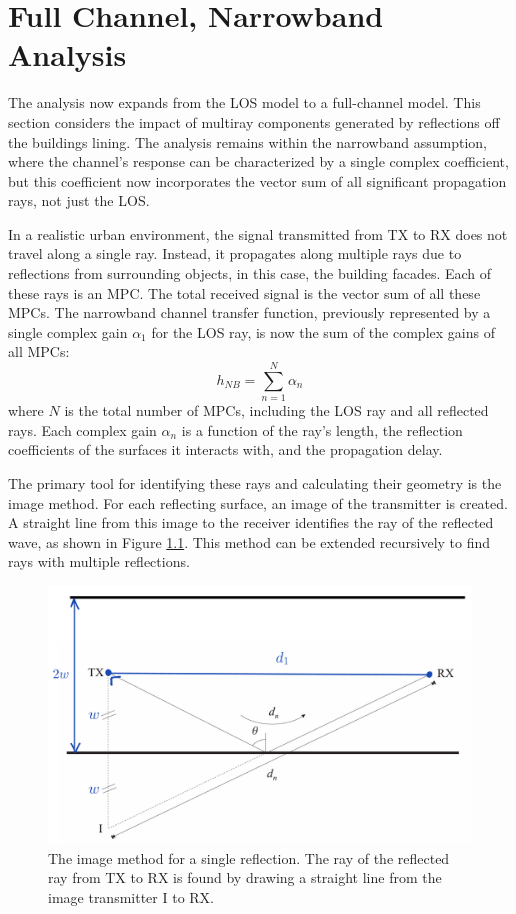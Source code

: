 \chapter{Full Channel, Narrowband Analysis}
\label{chap:full_narrow}

The analysis now expands from the LOS model to a full-channel model. This section considers the impact of multiray components generated by reflections off the buildings lining. The analysis remains within the narrowband assumption, where the channel's response can be characterized by a single complex coefficient, but this coefficient now incorporates the vector sum of all significant propagation rays, not just the LOS.


In a realistic urban environment, the signal transmitted from TX to RX does not travel along a single ray. Instead, it propagates along multiple rays due to reflections from surrounding objects, in this case, the building facades. Each of these rays is an MPC. The total received signal is the vector sum of all these MPCs. The narrowband channel transfer function, previously represented by a single complex gain $\alpha_1$ for the LOS ray, is now the sum of the complex gains of all MPCs:
\begin{equation}
	h_{NB} = \sum_{n=1}^{N} \alpha_n
\end{equation}
where $N$ is the total number of MPCs, including the LOS ray and all reflected rays. Each complex gain $\alpha_n$ is a function of the ray's length, the reflection coefficients of the surfaces it interacts with, and the propagation delay.

The primary tool for identifying these rays and calculating their geometry is the {image method}. For each reflecting surface, an image of the transmitter is created. A straight line from this image to the receiver identifies the ray of the reflected wave, as shown in Figure \ref{fig:image_method_single}. This method can be extended recursively to find rays with multiple reflections.

\begin{figure}[h!]
	\centering
	\includegraphics[width=0.7\linewidth]{content/4-images/image-method.png}
	\caption{The image method for a single reflection. The ray of the reflected ray from TX to RX is found by drawing a straight line from the image transmitter I to RX.}
	\label{fig:image_method_single}
\end{figure}


